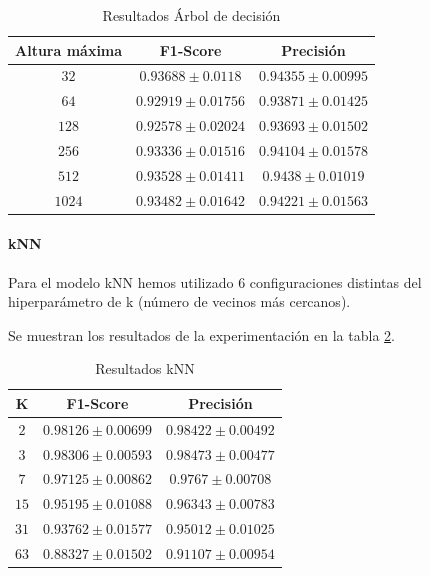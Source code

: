 \documentclass[12pt]{article}
\begin{document}
\begin{table}[!ht]
	\caption{Resultados Árbol de decisión}
	\centering
		 \begin{tabular}{||c c c||}
			\hline 
			Altura máxima & F1-Score & Precisión  \\ [0.5ex]  
			\hline\hline
			$32$ & $0.93688 \pm 0.0118$ & $0.94355 \pm 0.00995$ \\
			\hline 
			$64$ & $0.92919 \pm 0.01756$ & $0.93871 \pm 0.01425$ \\
			\hline 
			$128$ & $0.92578 \pm 0.02024$ & $0.93693 \pm 0.01502$ \\
			\hline 
			$256$ & $0.93336 \pm 0.01516$ & $0.94104 \pm 0.01578$ \\
			\hline 
			$512$ & $0.93528 \pm 0.01411$ & $0.9438 \pm 0.01019$ \\
			\hline 
			$1024$ & $0.93482 \pm 0.01642$ & $0.94221 \pm 0.01563$ \\
			\hline
		 \end{tabular}
	\label{Tab:DecisionTree_4}
	\end{table}

\paragraph{kNN}
Para el modelo kNN hemos utilizado 6 configuraciones distintas del hiperparámetro de k (número de vecinos más cercanos).

Se muestran los resultados de la experimentación en la tabla \ref{Tab:kNN_4}.

\begin{table}[!ht]
	\caption{Resultados kNN}
	\centering
		\begin{tabular}{||c c c||}
			\hline 
			K & F1-Score & Precisión  \\ [0.5ex]  
			\hline\hline
			$2$ & $0.98126 \pm 0.00699$ & $0.98422 \pm 0.00492$ \\
			\hline 
			$3$ & $0.98306 \pm 0.00593$ & $0.98473 \pm 0.00477$ \\
			\hline 
			$7$ & $0.97125 \pm 0.00862$ & $0.9767 \pm 0.00708$ \\
			\hline 
			$15$ & $0.95195 \pm 0.01088$ & $0.96343 \pm 0.00783$ \\
			\hline 
			$31$ & $0.93762 \pm 0.01577$ & $0.95012 \pm 0.01025$ \\
			\hline 
			$63$ & $0.88327 \pm 0.01502$ & $0.91107 \pm 0.00954$ \\
			\hline 
		\end{tabular}
	\label{Tab:kNN_4}
\end{table}
\end{document}
